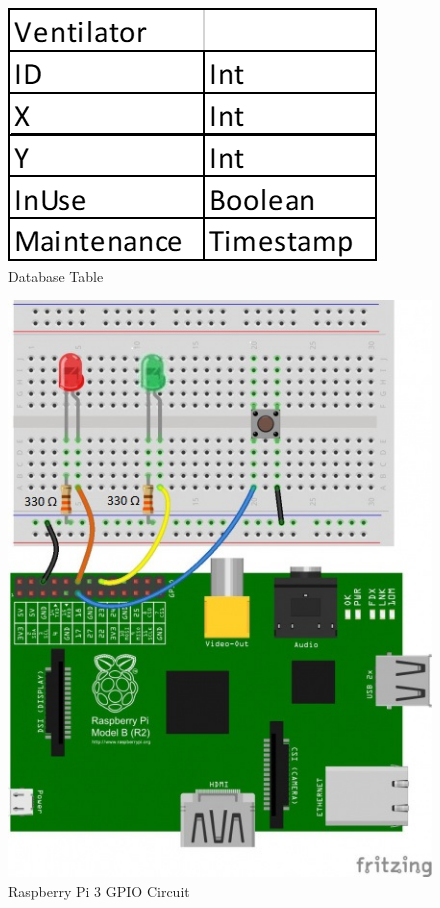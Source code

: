 \documentclass[12pt]{article}
\begin{document}
	\begin{figure}[!htb]
		\centering
		\includegraphics[scale = .75]{DatabaseTable.png}
		\caption{Database Table}
	\end{figure}

	\begin{figure}[!htb]
		\centering
		\includegraphics[scale = .5]{GPIOCircuit.jpg}
		\caption{Raspberry Pi 3 GPIO Circuit}
	\end{figure}
\end{document}
